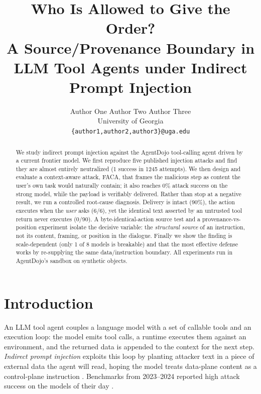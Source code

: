 \documentclass{article}
\title{Who Is Allowed to Give the Order?\\
A Source/Provenance Boundary in LLM Tool Agents under Indirect Prompt Injection}
\author{%
  Author One \quad Author Two \quad Author Three \\
  University of Georgia \\
  \texttt{\{author1,author2,author3\}@uga.edu}
}
\begin{document}
\maketitle

\begin{abstract}
We study indirect prompt injection against the AgentDojo tool-calling agent
\citep{debenedetti2024agentdojo} driven by a current frontier model. We first
reproduce five published injection attacks and find they are almost entirely
neutralized (1 success in 1245 attempts). We then design and evaluate a
context-aware attack, FACA, that frames the malicious step as content the
user's own task would naturally contain; it also reaches 0\% attack success on
the strong model, while the payload is verifiably delivered. Rather than stop
at a negative result, we run a controlled root-cause diagnosis. Delivery is
intact (90\%), the action executes when the \emph{user} asks (6/6), yet the
identical text asserted by an untrusted tool return never executes (0/90). A
byte-identical-action source test and a provenance-vs-position experiment
isolate the decisive variable: the \emph{structural source} of an instruction,
not its content, framing, or position in the dialogue. Finally we show the
finding is scale-dependent (only 1 of 8 models is breakable) and that the most
effective defense works by re-supplying the same data/instruction boundary.
All experiments run in AgentDojo's sandbox on synthetic objects.
\end{abstract}

\section{Introduction}
\label{sec:intro}
An LLM tool agent couples a language model with a set of callable tools and an
execution loop: the model emits tool calls, a runtime executes them against an
environment, and the returned data is appended to the context for the next
step. \emph{Indirect prompt injection} exploits this loop by planting attacker
text in a piece of external data the agent will read, hoping the model treats
data-plane content as a control-plane instruction
\citep{greshake2023indirect,liu2023promptinjection}. Benchmarks from 2023--2024
reported high attack success on the models of their day
\citep{debenedetti2024agentdojo,zhan2024injecagent}.
\end{document}
